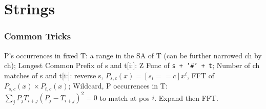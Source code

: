 \chapter{Strings}

\subsection{Common Tricks}
P's occurrences in fixed T: a range in the SA of T (can be further narrowed ch by ch);
Longest Common Prefix of s and t[i:]: Z Func of \texttt{s + '#' + t};
Number of ch matches of s and t[i:]: reverse s, $P_{s,c}(x)=[s_i==c]x^i$, FFT of $P_{s,c}(x) \times P_{t,c}(x)$;
Wildcard, P occurrences in T: $\sum_j{P_jT_{i+j}(P_j-T_{i+j})^2}=0$ to match at pos $i$. Expand then FFT.

